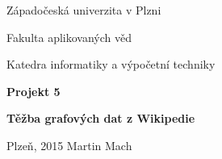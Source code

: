 \begin{titlepage}
	\hoffset -2.04cm
	\centering
	{\fontsize{22}{26}\selectfont Západočeská univerzita v Plzni\par}
	{\fontsize{22}{26}\selectfont Fakulta aplikovaných věd\par}
	{\fontsize{22}{26}\selectfont Katedra informatiky a výpočetní techniky\par}
	\vspace{3cm}
	{\fontsize{28}{33}\selectfont\bfseries Projekt 5\par}
	\vspace{3cm}
	{\fontsize{28}{33}\selectfont\bfseries Těžba grafových dat z Wikipedie\par}

	\vfill

	{
	\fontsize{16}{19}\selectfont
	\noindent Plzeň, 2015
	\hfill \hfill
	Martin Mach
	}
\end{titlepage}